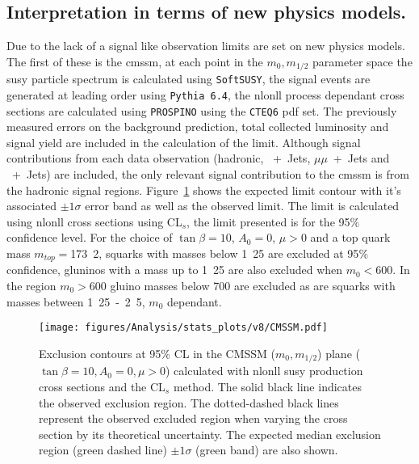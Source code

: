 \subsection{Interpretation in terms of new physics models.} %
\label{sub:interpretation_in_terms_of_new_physics_models_}
Due to the lack of a signal like observation limits are set on new physics models. The first of these is the \ac{cmssm}, at each point in the $m_{0}, m_{1/2}$ parameter space the \ac{susy} particle spectrum is calculated using \texttt{SoftSUSY}\cite{Allanach:2001kg}, the signal events are generated at leading order using \texttt{Pythia 6.4}\cite{pythia}, the \ac{nlonll} process dependant cross sections are calculated using \texttt{PROSPINO}\cite{Beenakker:1996ch} using the \texttt{CTEQ6}\cite{cteq6.1} \ac{pdf} set. The previously measured errors on the background prediction, total collected luminosity and signal yield are included in the calculation of the limit. Although signal contributions from each data observation (hadronic, \Pmu~+~Jets, $\mu\mu$~+~Jets and \Pphoton~+~Jets) are included, the only relevant signal contribution to the \ac{cmssm} is from the hadronic signal regions.
Figure~\ref{fig:cmssm-limit} shows the expected limit contour with it's associated $\pm1\sigma$ error band as well as the observed limit. The limit is calculated using \ac{nlonll} cross sections using CL$_s$\cite{cls-pdg}, the limit presented is for the 95$\%$ confidence level. For the choice of $\tan\beta = 10$, $A_0 = $\unit{0}{\GeV}, $\mu > 0$ and a top quark mass $m_{top} = $\unit{173.2}{\GeV}, squarks with masses below \unit{1.25}{\TeV} are excluded at 95$\%$ confidence, gluninos with a mass up to \unit{1.25}{\TeV} are also excluded when $m_{0} < $\unit{600}{\GeV}. In the region $m_{0} > $\unit{600}{\GeV} gluino masses below \unit{700}{\GeV} are excluded as are squarks with masses between \unit{1.25-2.5}{\TeV}, $m_{0}$ dependant.

\begin{figure}[h!]
  \begin{center}
    \texttt{[image: figures/Analysis/stats\_plots/v8/CMSSM.pdf]}
    \caption{\label{fig:cmssm-limit} Exclusion contours at 95$\%$ CL in
      the CMSSM ($m_0, m_{1/2}$) plane ($\tan \beta = 10, A_0 = 0, \mu
      > 0$) calculated with \ac{nlonll} \ac{susy} production cross sections and
      the CL$_{s}$ method. The solid black line indicates the observed
      exclusion region. The dotted-dashed black lines represent the
      observed excluded region when varying the cross section by its
      theoretical uncertainty. The expected median exclusion region
      (green dashed line) $\pm 1 \sigma$ (green band) are also
      shown. }
  \end{center}
\end{figure}


